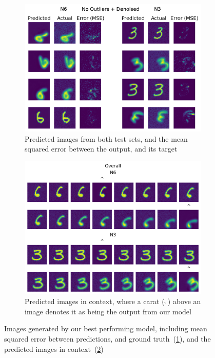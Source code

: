 \documentclass[twocolumn]{article}
\begin{document}
\begin{figure}
    \centering
    \begin{subfigure}{0.4\textwidth}
        \includegraphics[width=\textwidth]{assets/best-gen.png}
        \caption{Predicted images from both test sets, and the mean squared error between the output, and its target} 
        \label{fig:error}
    \end{subfigure}\hfill
    \begin{subfigure}{0.4\textwidth}
        \includegraphics[width=\textwidth]{assets/best-in-context.png}
        \caption{Predicted images in context, where a carat ($~\hat{}~$) above an image denotes it as being the output from our model} 
        \label{fig:in-context}
    \end{subfigure}
    \caption{Images generated by our best performing model, including mean squared error between predictions, and ground truth~(\ref{fig:error}), and the predicted images in context~(\ref{fig:in-context}) }
    \label{fig:quali}
\end{figure}
\end{document}
